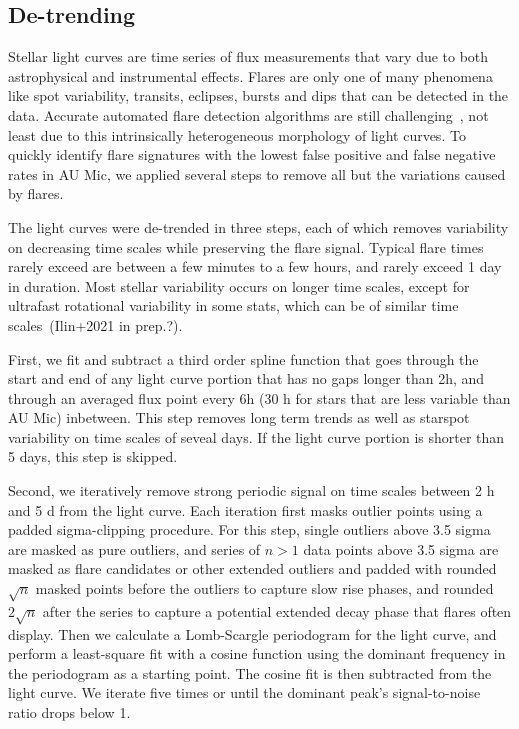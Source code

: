 \documentclass[fleqn,usenatbib,letters]{mnras}%
\begin{document}
\subsection{De-trending}
Stellar light curves are time series of flux measurements that vary due to both astrophysical and instrumental effects. Flares are only one of many phenomena like spot variability, transits, eclipses, bursts and dips that can be detected in the data. Accurate automated flare detection algorithms are still challenging~\citep{vida2021}, not least due to this intrinsically heterogeneous morphology of light curves. To quickly identify flare signatures with the lowest false positive and false negative rates in AU Mic, we applied several steps to remove all but the variations caused by flares.



The light curves were de-trended in three steps, each of which removes variability on decreasing time scales while preserving the flare signal. Typical flare times rarely exceed are between a few minutes to a few hours, and rarely exceed 1 day in duration. Most stellar variability occurs on longer time scales, except for ultrafast rotational variability in some stats, which can be of similar time scales~(Ilin+2021 in prep.?).   

First, we fit and subtract a third order spline function that goes through the start and end of any light curve portion that has no gaps longer than 2h, and through an averaged flux point every 6h (30 h for stars that are less variable than AU Mic) inbetween. This step removes long term trends as well as starspot variability on time scales of seveal days. If the light curve portion is shorter than 5 days, this step is skipped. 

Second, we iteratively remove strong periodic signal on time scales between 2 h and 5 d from the light curve. Each iteration first masks outlier points using a padded sigma-clipping procedure. For this step, single outliers above 3.5 sigma are masked as pure outliers, and series of $n>1$ data points above 3.5 sigma are masked as flare candidates or other extended outliers and padded with rounded $\sqrt{n}$ masked points before the outliers to capture slow rise phases, and rounded $2\sqrt{n}$ after the series to capture a potential extended decay phase that flares often display. Then we calculate a Lomb-Scargle periodogram for the light curve, and perform a least-square fit with a cosine function using the dominant frequency in the periodogram as a starting point. The cosine fit is then subtracted from the light curve. We iterate five times or until the dominant peak's signal-to-noise ratio drops below 1. 
\end{document}
